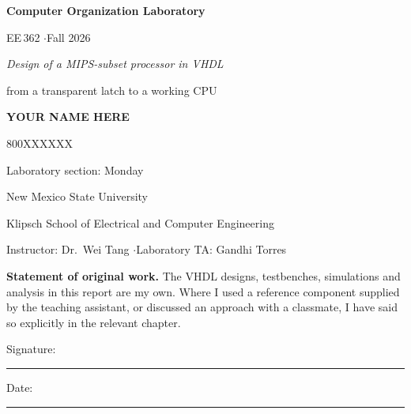 
\newcommand{\studentname}{YOUR NAME HERE}
\newcommand{\studentid}{800XXXXXX}
\newcommand{\labsection}{Monday}      %

\begin{titlepage}
\centering
\vspace*{2.5cm}

{\Huge\bfseries Computer Organization Laboratory\par}
\vspace{6pt}
{\Large EE\,362 \quad$\cdot$\quad Fall 2026\par}

\vspace{1.2cm}
{\large\itshape Design of a MIPS-subset processor in VHDL\par}
\vspace{4pt}
{\normalsize from a transparent latch to a working CPU\par}

\vspace{2.4cm}
{\Large\bfseries \studentname\par}
\vspace{4pt}
{\large \studentid\par}
\vspace{10pt}
{\large Laboratory section: \labsection\par}

\vspace{2.4cm}
{\normalsize New Mexico State University\par}
{\normalsize Klipsch School of Electrical and Computer Engineering\par}
\vspace{6pt}
{\normalsize Instructor: Dr.~Wei Tang \quad$\cdot$\quad Laboratory TA: Gandhi Torres\par}

\vfill
{\small\textbf{Statement of original work.}\; The VHDL designs, testbenches,
simulations and analysis in this report are my own. Where I used a reference
component supplied by the teaching assistant, or discussed an approach with a
classmate, I have said so explicitly in the relevant chapter.\par}
\vspace{10pt}
{\small Signature: \rule{6cm}{0.4pt} \hfill Date: \rule{3.5cm}{0.4pt}\par}

\end{titlepage}
